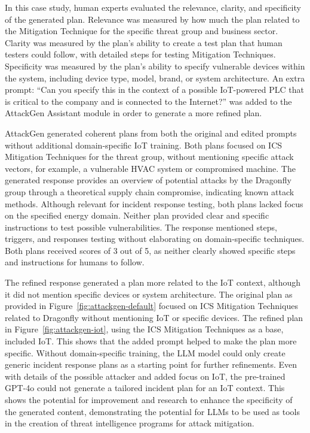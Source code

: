 In this case study, human experts evaluated the relevance, clarity, and specificity of the generated plan.
Relevance was measured by how much the plan related to the Mitigation Technique for the specific threat group and business sector.
Clarity was measured by the plan's ability to create a test plan that human testers could follow, with detailed steps for testing Mitigation Techniques.
Specificity was measured by the plan's ability to specify vulnerable devices within the system, including device type, model, brand, or system architecture.
An extra prompt: ``Can you specify this in the context of a possible IoT-powered PLC that is critical to the company and is connected to the Internet?'' was added to the AttackGen Assistant module in order to generate a more refined plan.

AttackGen generated coherent plans from both the original and edited prompts without additional domain-specific IoT training.
Both plans focused on ICS Mitigation Techniques for the threat group, without mentioning specific attack vectors, for example, a vulnerable HVAC system or compromised machine.
The generated response provides an overview of potential attacks by the Dragonfly group through a theoretical supply chain compromise, indicating known attack methods.
Although relevant for incident response testing, both plans lacked focus on the specified energy domain.
Neither plan provided clear and specific instructions to test possible vulnerabilities. The response mentioned steps, triggers, and responses testing without elaborating on domain-specific techniques.
Both plans received scores of 3 out of 5, as neither clearly showed specific steps and instructions for humans to follow.

The refined response generated a plan more related to the IoT context, although it did not mention specific devices or system architecture.
The original plan as provided in Figure~\ref{fig:attackgen-default} focused on ICS Mitigation Techniques related to Dragonfly without mentioning IoT or specific devices.
The refined plan in Figure~\ref{fig:attackgen-iot}, using the ICS Mitigation Techniques as a base, included IoT.
This shows that the added prompt helped to make the plan more specific.
Without domain-specific training, the LLM model could only create generic incident response plans as a starting point for further refinements.
Even with details of the possible attacker and added focus on IoT, the pre-trained GPT-4o could not generate a tailored incident plan for an IoT context.
This shows the potential for improvement and research to enhance the specificity of the generated content, demonstrating the potential for LLMs to be used as tools in the creation of threat intelligence programs for attack mitigation.
%
